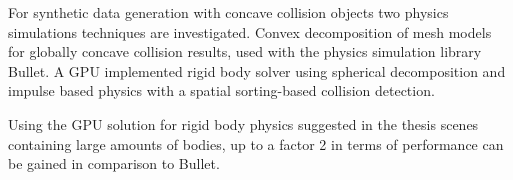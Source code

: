 For synthetic data generation with concave collision objects two physics simulations techniques are investigated.
Convex decomposition of
mesh models for globally concave collision results, used with the physics simulation
library Bullet. A GPU implemented rigid body solver using spherical decomposition
and impulse based physics with a spatial sorting-based collision detection.

Using the GPU solution for rigid body physics suggested in the thesis scenes
 containing large amounts of bodies, up to a factor 2 in terms of performance can be gained in comparison to Bullet.
